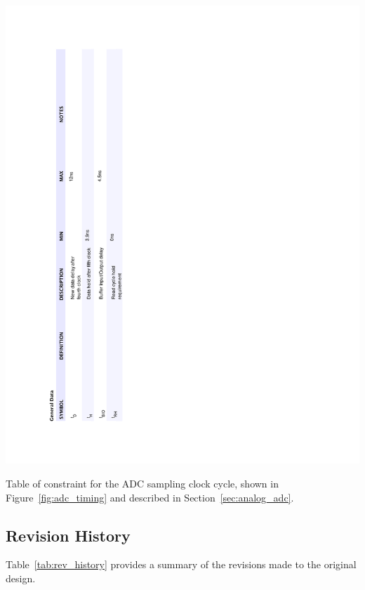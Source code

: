 \documentclass[titlepage]{scrartcl}
\begin{document}
	\clearpage

	\begin{table}[h!]
	\vspace{-2cm}
	\centerline{\includegraphics[width=20cm]{img/adc_table.pdf}}
		\vspace{0cm}
                	\caption{Table of constraint for the ADC sampling clock cycle, shown in Figure~\ref{fig:adc_timing} and described in Section~\ref{sec:analog_adc}.}
               	\label{tab:adc_timing}
	\end{table}

	\clearpage

	\subsection{Revision History}
	Table~\ref{tab:rev_history} provides a summary of the revisions made to the original design.\\
\end{document}
